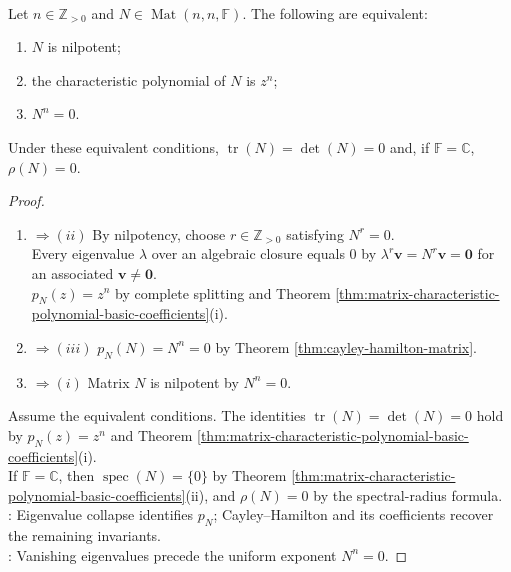 \begin{proposition} \label{prop:nilpotent-matrix-basic-invariants} \\
Let $n\in\mathbb{Z}_{>0}$ and $N\in\operatorname{Mat}(n,n,\mathbb{F})$. The following are equivalent:
\begin{enumerate}[label=(\roman*)]
\setlength{\itemsep}{0pt}
\item $N$ is nilpotent;
\item the characteristic polynomial of $N$ is $z^n$;
\item $N^n=0$.
\end{enumerate}
Under these equivalent conditions, $\operatorname{tr}(N)=\det(N)=0$ and, if $\mathbb{F}=\mathbb{C}$, $\rho(N)=0$.
\begin{proof}
\begin{enumerate}[label=(\roman*)]
\setlength{\itemsep}{0pt}
\item[$(i)$]$\Rightarrow (ii)$ By nilpotency, choose $r\in\mathbb{Z}_{>0}$ satisfying $N^r=0$.\\
Every eigenvalue $\lambda$ over an algebraic closure equals $0$ by $\lambda^r\mathbf{v}=N^r\mathbf{v}=\mathbf{0}$ for an associated $\mathbf{v}\neq\mathbf{0}$.\\
$p_N(z)=z^n$ by complete splitting and Theorem \ref{thm:matrix-characteristic-polynomial-basic-coefficients}(i). \item[$(ii)$]$\Rightarrow (iii)$ $p_N(N)=N^n=0$ by Theorem \ref{thm:cayley-hamilton-matrix}. \item[$(iii)$]$\Rightarrow (i)$ Matrix $N$ is nilpotent by $N^n=0$.
\end{enumerate}
Assume the equivalent conditions. The identities $\operatorname{tr}(N)=\det(N)=0$ hold by $p_N(z)=z^n$ and Theorem \ref{thm:matrix-characteristic-polynomial-basic-coefficients}(i).\\
If $\mathbb{F}=\mathbb{C}$, then $\operatorname{spec}(N)=\{0\}$ by Theorem \ref{thm:matrix-characteristic-polynomial-basic-coefficients}(ii), and $\rho(N)=0$ by the spectral-radius formula.\\
: Eigenvalue collapse identifies $p_N$; Cayley--Hamilton and its coefficients recover the remaining invariants.\\
: Vanishing eigenvalues precede the uniform exponent $N^n=0$.
\end{proof}
\end{proposition}


